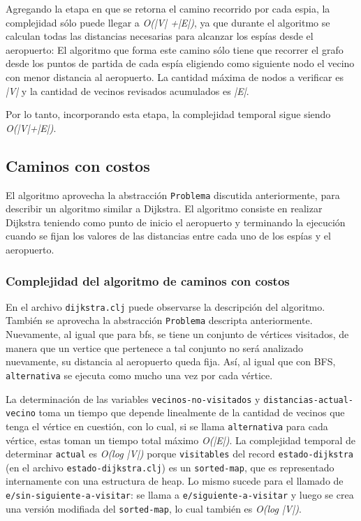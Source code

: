 \documentclass{article}
\begin{document}
Agregando la etapa en que se retorna el camino recorrido por cada espia, la complejidad sólo puede llegar a \textit{O(|V| +|E|)}, ya que durante el algoritmo se calculan todas las distancias necesarias para alcanzar los espías desde el aeropuerto: El algoritmo que forma este camino sólo tiene que recorrer el grafo desde los puntos de partida de cada espía eligiendo como siguiente nodo el vecino con menor distancia al aeropuerto. La cantidad máxima de nodos a verificar es \textit{|V|} y la cantidad de vecinos revisados acumulados es \textit{|E|}.

Por lo tanto, incorporando esta etapa, la complejidad temporal sigue siendo \textit{O(|V|+|E|)}.

\subsection{Caminos con costos}

El algoritmo aprovecha la abstracción \texttt{Problema} discutida anteriormente, para describir un algoritmo similar a Dijkstra. El algoritmo consiste en realizar Dijkstra teniendo como punto de inicio el aeropuerto y terminando la ejecución cuando se fijan los valores de las distancias entre cada uno de los espías y el aeropuerto.

\subsubsection{Complejidad del algoritmo de caminos con costos}

En el archivo \texttt{dijkstra.clj} puede observarse la descripción del algoritmo. También se aprovecha la abstracción \texttt{Problema} descripta anteriormente. Nuevamente, al igual que para bfs, se tiene un conjunto de vértices visitados, de manera que un vertice que pertenece a tal conjunto no será analizado nuevamente, su distancia al aeropuerto queda fija. Así, al igual que con BFS, \texttt{alternativa} se ejecuta como mucho una vez por cada vértice.

La determinación de las variables \texttt{vecinos-no-visitados} y \texttt{distancias-actual-vecino} toma un tiempo que depende linealmente de la cantidad de vecinos que tenga el vértice en cuestión, con lo cual, si se llama \texttt{alternativa} para cada vértice, estas toman un tiempo total máximo \textit{O(|E|)}. La complejidad temporal de determinar \texttt{actual}  es \textit{O(log |V|)} porque \texttt{visitables} del record \texttt{estado-dijkstra} (en el archivo \texttt{estado-dijkstra.clj}) es un \texttt{sorted-map}, que es representado internamente con una estructura de heap. Lo mismo sucede para el llamado de \texttt{e/sin-siguiente-a-visitar}: se llama a \texttt{e/siguiente-a-visitar} y luego se crea una versión modifiada del \texttt{sorted-map}, lo cual también es \textit{O(log |V|)}.
\end{document}
